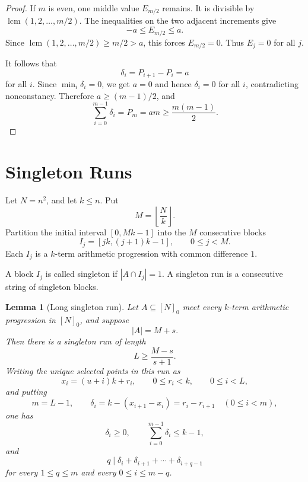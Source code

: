 \documentclass[11pt]{article}
\newtheorem{lemma}[theorem]{Lemma}
\theoremstyle{remark}
\newcommand{\lcm}{\operatorname{lcm}}
\newcommand{\floor}[1]{\left\lfloor #1\right\rfloor}
\numberwithin{equation}{section}
\begin{document}
\begin{proof}
If $m$ is even, one middle value $E_{m/2}$ remains.
It is divisible by $\lcm(1,2,\ldots,m/2)$.
The inequalities on the two adjacent increments give
\[
        -a\le E_{m/2}\le a.
\]
Since $\lcm(1,2,\ldots,m/2)\ge m/2>a$, this forces $E_{m/2}=0$.
Thus $E_j=0$ for all $j$.

It follows that
\[
        \delta_i=P_{i+1}-P_i=a
\]
for all $i$.
Since $\min_i\delta_i=0$, we get $a=0$ and hence $\delta_i=0$ for all $i$, contradicting nonconstancy.
Therefore $a\ge(m-1)/2$, and
\[
        \sum_{i=0}^{m-1}\delta_i=P_m=am\ge \frac{m(m-1)}2.
\]
\end{proof}

\section{Singleton Runs}

Let $N=n^2$, and let $k\le n$.
Put
\[
        M=\floor{\frac{N}{k}}.
\]
Partition the initial interval $[0,Mk-1]$ into the $M$ consecutive blocks
\[
        I_j=[jk,(j+1)k-1],
        \qquad
        0\le j<M.
\]
Each $I_j$ is a $k$-term arithmetic progression with common difference $1$.

A block $I_j$ is called singleton if $|A\cap I_j|=1$.
A singleton run is a consecutive string of singleton blocks.

\begin{lemma}[Long singleton run]\label{lem:run}
Let $A\subseteq[N]_0$ meet every $k$-term arithmetic progression in $[N]_0$, and suppose
\[
        |A|=M+s.
\]
Then there is a singleton run of length
\[
        L\ge \frac{M-s}{s+1}.
\]
Writing the unique selected points in this run as
\[
        x_i=(u+i)k+r_i,
        \qquad
        0\le r_i<k,
        \qquad
        0\le i<L,
\]
and putting
\[
        m=L-1,
        \qquad
        \delta_i=k-(x_{i+1}-x_i)=r_i-r_{i+1}
        \quad (0\le i<m),
\]
one has
\[
        \delta_i\ge0,
        \qquad
        \sum_{i=0}^{m-1}\delta_i\le k-1,
\]
and
\[
        q\mid \delta_i+\delta_{i+1}+\cdots+\delta_{i+q-1}
\]
for every $1\le q\le m$ and every $0\le i\le m-q$.
\end{lemma}
\end{document}

